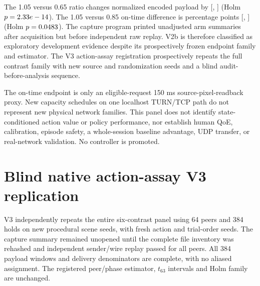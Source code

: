 \documentclass[10pt]{article}
\begin{document}
The 1.05 versus 0.65 ratio changes normalized encoded payload by
\NativeActionVTwoPayloadContrast{} [\NativeActionVTwoPayloadLowCI{},
\NativeActionVTwoPayloadHighCI{}] (Holm
$p=2.33e-14{}$). The 1.05 versus 0.85 on-time difference
is \NativeActionVTwoDeliveryContrast{} percentage points
[\NativeActionVTwoDeliveryLowCI{}, \NativeActionVTwoDeliveryHighCI{}]
(Holm $p=0.0483{}$). The capture program printed
unadjusted arm summaries after acquisition but before independent raw replay.
V2b is therefore classified as exploratory development evidence despite its
prospectively frozen endpoint family and estimator. The V3 action-assay
registration prospectively repeats the full contrast family with new source and
randomization seeds and a blind audit-before-analysis sequence.

The on-time endpoint is only an eligible-request 150 ms source-pixel-readback
proxy. New capacity schedules on one localhost TURN/TCP path do not represent
new physical network families. This panel does not identify state-conditioned
action value or policy performance, nor establish human QoE, calibration,
episode safety, a whole-session baseline advantage, UDP transfer, or
real-network validation. No controller is promoted.
\begin{table}[ht]
\centering\resizebox{\linewidth}{!}{}
\caption{Factual V2b arm means. These are exploratory because the capture command exposed unadjusted summaries before the independent audit. On-time is a source-readback proxy, not human QoE.}
\label{tab:native-turn-action-v2b-arms}
\end{table}
\begin{table}[ht]
\centering\resizebox{\linewidth}{!}{}
\caption{V2b registered proximal contrasts with peer-clustered intervals and Holm adjustment across six tests. Intervals condition on 64 peers and the fixed content/schedule panel; the result remains exploratory.}
\label{tab:native-turn-action-v2b-contrasts}
\end{table}

\section{Blind native action-assay V3 replication}
\label{app:native-turn-action-v3}

V3 independently repeats the entire six-contrast panel using 64 peers and 384
holds on new procedural scene seeds, with fresh action and trial-order seeds.
The capture summary remained unopened until the complete file inventory was
rehashed and independent sender/wire replay passed for all peers. All 384
payload windows and delivery denominators are complete, with no aliased
assignment. The registered peer/phase estimator, $t_{63}$ intervals and Holm
family are unchanged.
\end{document}
